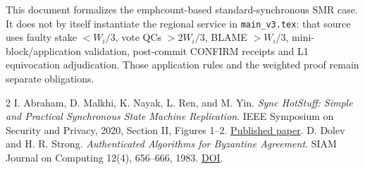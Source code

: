 \documentclass[10pt,a4paper]{article}
\begin{document}
This document formalizes the emph{count-based} standard-synchronous SMR
case. It does not by itself instantiate the regional service in
\texttt{main\_v3.tex}: that source uses faulty stake $<W_i/3$, vote QCs
$>2W_i/3$, BLAME $>W_i/3$, mini-block/application validation,
post-commit CONFIRM receipts and L1 equivocation adjudication. Those
application rules and the weighted proof remain separate obligations.

\begin{thebibliography}{2}\small
{}
I. Abraham, D. Malkhi, K. Nayak, L. Ren, and M. Yin.
\emph{Sync HotStuff: Simple and Practical Synchronous State Machine
Replication}. IEEE Symposium on Security and Privacy, 2020,
Section II, Figures 1--2.
\href{https://conferences.computer.org/sp/pdfs/sp/2020/349700a106.pdf}{Published paper}.
D. Dolev and H. R. Strong.
\emph{Authenticated Algorithms for Byzantine Agreement}.
SIAM Journal on Computing 12(4), 656--666, 1983.
\href{https://doi.org/10.1137/0212045}{DOI}.
\end{thebibliography}
\end{document}
